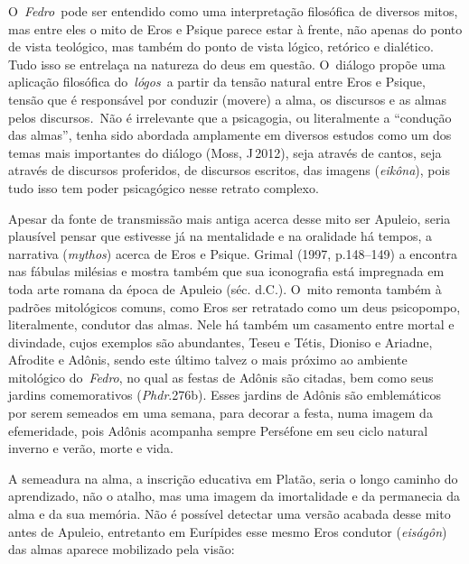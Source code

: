  

O~\emph{Fedro}~pode ser entendido como uma interpretação filosófica de
diversos mitos, mas entre eles o mito de Eros e Psique parece estar à
frente, não apenas do ponto de vista teológico, mas também do ponto de
vista lógico, retórico e dialético. Tudo isso se entrelaça na natureza
do deus em questão. O~diálogo propõe uma aplicação filosófica
do~\emph{lógos}~a partir da tensão natural entre Eros e Psique, tensão
que é responsável por conduzir (movere) a alma, os discursos e as almas
pelos discursos\emph{.}~Não é irrelevante que a psicagogia, ou
literalmente a ``condução das almas'', tenha sido abordada amplamente em
diversos estudos como um dos temas mais importantes do diálogo (Moss, J\,2012), seja através de cantos, seja através de discursos proferidos, de
discursos escritos, das imagens (\emph{eikôna}), pois tudo isso tem
poder psicagógico nesse retrato complexo.

Apesar da fonte de transmissão mais antiga acerca desse mito ser
Apuleio, seria plausível pensar que estivesse já na mentalidade e na
oralidade há tempos, a narrativa (\emph{mythos}) acerca de Eros e
Psique. Grimal (1997, p.148--149) a encontra nas fábulas milésias e
mostra também que sua iconografia está impregnada em toda arte romana da
época de Apuleio (séc.  d.C.). O~mito remonta também à padrões
mitológicos comuns, como Eros ser retratado como um deus psicopompo,
literalmente, condutor das almas. Nele há também um casamento entre
mortal e divindade, cujos exemplos são abundantes, Teseu e Tétis,
Dioniso e Ariadne, Afrodite e Adônis, sendo este último talvez o mais
próximo ao ambiente mitológico do~\emph{Fedro}, no qual as festas de
Adônis são citadas, bem como seus jardins comemorativos
(\emph{Phdr}.276b). Esses jardins de Adônis são emblemáticos por serem
semeados em uma semana, para decorar a festa, numa imagem da
efemeridade, pois Adônis acompanha sempre Perséfone em seu ciclo natural
inverno e verão, morte e vida.

A semeadura na alma, a inscrição educativa em Platão, seria o longo
caminho do aprendizado, não o atalho, mas uma imagem da imortalidade e
da permanecia da alma e da sua memória. Não é possível detectar uma
versão acabada desse mito antes de Apuleio, entretanto em Eurípides esse
mesmo Eros condutor (\emph{eiságôn}) das almas aparece mobilizado pela
visão:

 

